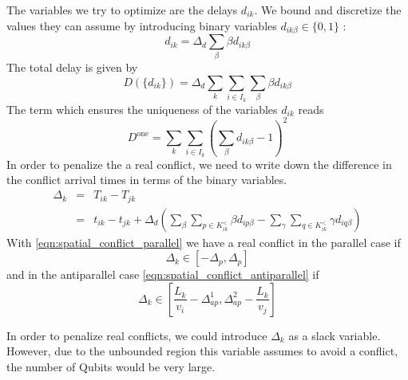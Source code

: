 \documentclass{article}
\begin{document}
The variables we try to optimize are the delays $d_{ik}$.
We bound and discretize the values they can assume by introducing binary variables $d_{ik\beta}\in\{0, 1\}$ :
\begin{equation*}
    d_{ik} = \Delta_d \sum_\beta \beta d_{ik\beta}
\end{equation*}
The total delay is given by
\begin{equation}
    D(\{d_{ik}\}) = \Delta_d \sum_k \sum_{i \in I_k} \sum_\beta \beta d_{ik\beta}
\end{equation}
The term which ensures the uniqueness of the variables $d_{ik}$ reads
\begin{equation}
    D^\text{one} =  \sum_k \sum_{i \in I_k} \left( \sum_\beta d_{ik\beta} - 1\right)^2
\end{equation}
In order to penalize the a real conflict, we need to write down the difference in the conflict arrival times in terms of the binary variables.
\begin{eqnarray*}
    \Delta_k &=& T_{ik} - T_{jk} \\
             &=& t_{ik} - t_{jk} + \Delta_d \left( \sum_\beta \sum_{p\in K^<_{ik}} \beta d_{ip\beta}  - \sum_\gamma \sum_{q\in K^<_{ik}} \gamma d_{iq\beta} \right)
\end{eqnarray*}
With \eqref{eqn:spatial_conflict_parallel} we have a real conflict in the parallel case if
\begin{equation*}
    \Delta_k \in [-\Delta_p, \Delta_p]
\end{equation*}
and in the antiparallel case \eqref{eqn:spatial_conflict_antiparallel} if
\begin{equation*}
    \Delta_k \in \left[\frac{L_k}{v_i} - \Delta^1_{ap}, \Delta^2_{ap} - \frac{L_k}{v_j}\right]
\end{equation*}

In order to penalize real conflicts, we could introduce $\Delta_k$ as a slack variable.
However, due to the unbounded region this variable assumes to avoid a conflict, the number of Qubits would be very large.
\end{document}
